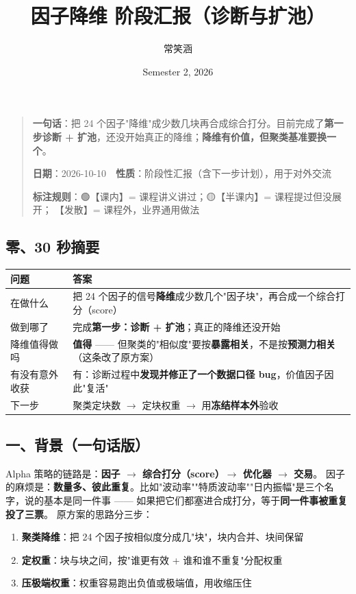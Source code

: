 \documentclass[11pt]{article}
\title{因子降维 阶段汇报（诊断与扩池）}
\author{常笑涵}
\date{Semester 2, 2026}
\begin{document}
\maketitle
\tableofcontents
\newpage
\begin{quote}
\textbf{一句话}：把 24 个因子"降维"成少数几块再合成综合打分。目前完成了\textbf{第一步诊断 + 扩池}，还没开始真正的降维；\textbf{降维有价值，但聚类基准要换一个}。

\textbf{日期}：2026-10-10　\textbf{性质}：阶段性汇报（含下一步计划），用于对外交流

\textbf{标注规则}：🟢【课内】= 课程讲义讲过；🟡【半课内】= 课程提过但没展开；🔴【发散】= 课程外，业界通用做法
\end{quote}
\subsection{\texorpdfstring{零、30 秒摘要}{零、30 秒摘要}}
{\small
\begin{longtable}{p{2.27cm}p{13.93cm}}
\toprule
问题 & 答案 \\
\midrule
在做什么 & 把 24 个因子的信号\textbf{降维}成少数几个"因子块"，再合成一个综合打分（score） \\
做到哪了 & 完成\textbf{第一步：诊断 + 扩池}；真正的降维还没开始 \\
降维值得做吗 & \textbf{值得} ------ 但聚类的"相似度"要按\textbf{暴露相关}，不是按\textbf{预测力相关}（这条改了原方案） \\
有没有意外收获 & 有：诊断过程中\textbf{发现并修正了一个数据口径 bug}，价值因子因此"复活" \\
下一步 & 聚类定块数 \ensuremath{\rightarrow} 定块权重 \ensuremath{\rightarrow} 用\textbf{冻结样本外}验收 \\
\bottomrule
\end{longtable}
}
\subsection{\texorpdfstring{一、背景（一句话版）}{一、背景（一句话版）}}
Alpha 策略的链路是：\textbf{因子 \ensuremath{\rightarrow} 综合打分（score）\ensuremath{\rightarrow} 优化器 \ensuremath{\rightarrow} 交易}。
因子的麻烦是：\textbf{数量多、彼此重复}。比如"波动率""特质波动率""日内振幅"是三个名字，说的基本是同一件事 ------ 如果把它们都塞进合成打分，等于\textbf{同一件事被重复投了三票}。
原方案的思路分三步：
\begin{enumerate}
  \item \textbf{聚类降维}：把 24 个因子按相似度分成几"块"，块内合并、块间保留
  \item \textbf{定权重}：块与块之间，按"谁更有效 + 谁和谁不重复"分配权重
  \item \textbf{压极端权重}：权重容易跑出负值或极端值，用收缩压住
\end{enumerate}
\end{document}
